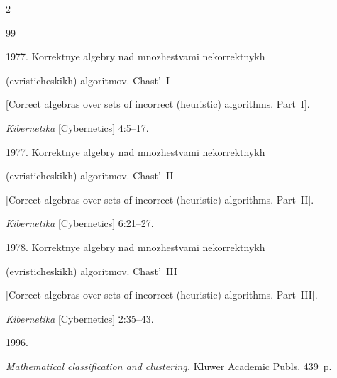   \begin{multicols}{2}





\renewcommand{\bibname}{\protect\rmfamily References}







{\small\frenchspacing


 {%




 \begin{thebibliography}{99}




 1977. Korrektnye  algebry nad mnozhestvami nekorrektnykh 


(evristicheskikh) algoritmov. Chast'~I 


[Correct algebras over sets of incorrect (heuristic) algorithms. Part~I]. 


\textit{Kibernetika} [Cybernetics] 4:5--17.







 1977. Korrektnye  algebry nad mno\-zhe\-st\-va\-mi nekorrektnykh 


(evristicheskikh) algoritmov. Chast'~II 


[Correct algebras over sets of incorrect (heuristic) algorithms. Part~II]. 


\textit{Kibernetika} [Cybernetics] 6:21--27.







 1978. Korrektnye  algebry nad mno\-zhe\-st\-va\-mi nekorrektnykh 


(evristicheskikh) algoritmov. Chast'~III 


[Correct algebras over sets of incorrect (heuristic) algorithms. Part~III]. 


\textit{Kibernetika} [Cybernetics] 2:35--43.




 1996. 


\textit{Mathematical classification and clustering.} Kluwer Academic Publs. 439~p.



\end{thebibliography}}}
\end{multicols}
